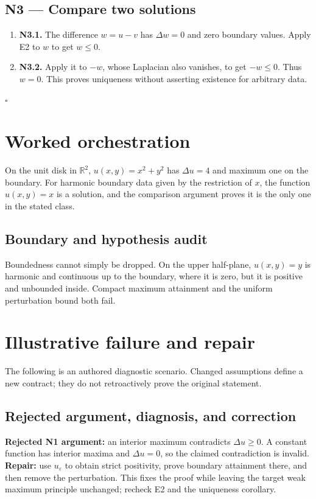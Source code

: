 \documentclass[preprint,12pt,aps,pra,showkeys,amsmath,amssymb,superscriptaddress,floatfix]{revtex4-2}
\theoremstyle{definition}
\theoremstyle{remark}
\begin{document}
\subsection{N3 --- Compare two
solutions}\label{n3-compare-two-solutions}

\begin{enumerate}
\def\labelenumi{\arabic{enumi}.}
\item
  \textbf{N3.1.} The difference \(w=u-v\) has \(\Delta w=0\) and zero
  boundary values. Apply E2 to \(w\) to get \(w\le0\).
\item
  \textbf{N3.2.} Apply it to \(-w\), whose Laplacian also vanishes, to
  get \(-w\le0\). Thus \(w=0\). This proves uniqueness without asserting
  existence for arbitrary data.
\end{enumerate}

\hfill$\square$

\section{Worked orchestration}

On the unit disk in \(\mathbb R^2\), \(u(x,y)=x^2+y^2\) has
\(\Delta u=4\) and maximum one on the boundary. For harmonic boundary
data given by the restriction of \(x\), the function \(u(x,y)=x\) is a
solution, and the comparison argument proves it is the only one in the
stated class.

\subsection{Boundary and hypothesis audit}

Boundedness cannot simply be dropped. On the upper half-plane,
\(u(x,y)=y\) is harmonic and continuous up to the boundary, where it is
zero, but it is positive and unbounded inside. Compact maximum
attainment and the uniform perturbation bound both fail.

\section{Illustrative failure and repair}

The following is an authored diagnostic scenario. Changed assumptions
define a new contract; they do not retroactively prove the original
statement.

\subsection{Rejected argument, diagnosis, and correction}
\textbf{Rejected N1 argument:} an interior maximum contradicts
\(\Delta u\ge0\). A constant function has interior maxima and
\(\Delta u=0\), so the claimed contradiction is invalid.
\textbf{Repair:} use \(u_\varepsilon\) to obtain strict positivity,
prove boundary attainment there, and then remove the perturbation. This
fixes the proof while leaving the target weak maximum principle
unchanged; recheck E2 and the uniqueness corollary.
\end{document}

